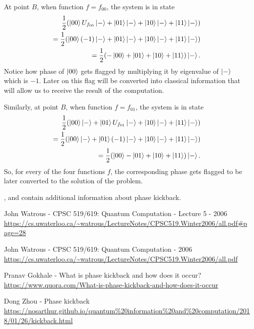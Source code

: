 \documentclass[12pt,twoside,a4paper]{article}
\begin{document}
At point $B$, when function $f = f_{00}$, the system is in state
\begin{equation*}
        \begin{split}
                \frac{1}{2} (\ket{00} U_{f_{00}} \ket{-} + \ket{01} \ket{-} + \ket{10} \ket{-} + \ket{11} \ket{-}) \\
                = \frac{1}{2} (\ket{00} (-1) \ket{-} + \ket{01} \ket{-} + \ket{10} \ket{-} + \ket{11} \ket{-}) \\
                = \frac{1}{2} (- \ket{00} + \ket{01} + \ket{10} + \ket{11}) \ket{-}.
        \end{split}
\end{equation*}
Notice how phase of $\ket{00}$ gets flagged by multiplying it by eigenvalue of $\ket{-}$ which is $-1$.
Later on this flag will be converted into classical information that will allow us to receive the result of the computation.

Similarly, at point $B$, when function $f = f_{01}$, the system is in state
\begin{equation*}
        \begin{split}
                \frac{1}{2} (\ket{00} \ket{-} + \ket{01} U_{f_{01}} \ket{-} + \ket{10} \ket{-} + \ket{11} \ket{-}) \\
                = \frac{1}{2} (\ket{00} \ket{-} + \ket{01} (-1) \ket{-} + \ket{10} \ket{-} + \ket{11} \ket{-}) \\
                = \frac{1}{2} (\ket{00} - \ket{01} + \ket{10} + \ket{11}) \ket{-}.
        \end{split}
\end{equation*}
So, for every of the four functions $f$, the corresponding phase gets flagged to be later converted to the solution of the problem.

\cite{watrous}, \cite{gokhale} and \cite{zhou} contain additional information about phase kickback.

\begin{thebibliography}{99}
         \hypertarget{watrous5}{} John Watrous - CPSC 519/619: Quantum Computation
        - Lecture 5 - 2006 \\
        \url{https://cs.uwaterloo.ca/~watrous/LectureNotes/CPSC519.Winter2006/all.pdf#page=28}

         \hypertarget{watrous}{} John Watrous - CPSC 519/619: Quantum Computation - 2006 \\
        \url{https://cs.uwaterloo.ca/~watrous/LectureNotes/CPSC519.Winter2006/all.pdf}

         \hypertarget{gokhale}{} Pranav Gokhale - What is phase kickback and how does it occur? \\
        \url{https://www.quora.com/What-is-phase-kickback-and-how-does-it-occur}

         \hypertarget{zhou}{} Dong Zhou - Phase kickback \\
        \url{https://nosarthur.github.io/quantum%20information%20and%20computation/2018/01/26/kickback.html}
\end{thebibliography}
\end{document}
